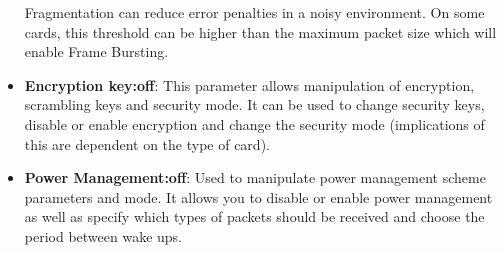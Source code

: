 \begin{itemize}
Fragmentation can reduce error penalties in a noisy environment. On some cards, this threshold can be higher than the maximum packet size which will enable Frame Bursting.\\
%
\item \textbf{Encryption key:off}: This parameter allows manipulation of encryption, scrambling keys and security mode. It can be used to change security keys,
disable or enable encryption and change the security mode (implications of this are dependent on the type of card). \\
%
\item \textbf{Power Management:off}: Used to manipulate power management scheme parameters and mode. It allows you to disable or enable power management as well as specify which types
of packets should be received and choose the period between wake ups.\\
\end{itemize}
